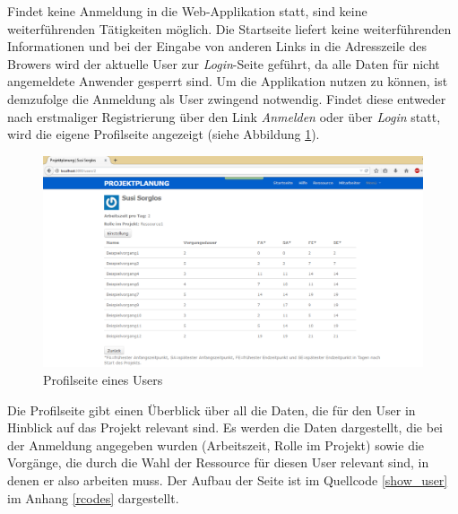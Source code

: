 \documentclass[a4paper,12pt,parskip,bibtotoc,liststotoc]{article}
\begin{document}
Findet keine Anmeldung in die Web-Applikation statt, sind keine weiterführenden Tätigkeiten möglich. Die Startseite liefert keine weiterführenden Informationen und bei der Eingabe von anderen Links in die Adresszeile des Browers wird der aktuelle User zur \textit{Login}-Seite geführt, da alle Daten für nicht angemeldete Anwender gesperrt sind. %
Um die Applikation nutzen zu können, ist demzufolge die Anmeldung als User zwingend notwendig. Findet diese entweder nach erstmaliger Registrierung über den Link \textit{Anmelden} oder über \textit{Login} statt, wird die eigene Profilseite angezeigt (siehe Abbildung \ref{Profil}).\\

\begin{figure}[h!]
  \begin{center}
    \includegraphics[width=120mm]{Bilder/Profilseite.png}
    \caption{Profilseite eines Users}  \label{Profil}
  \end{center}
\end{figure}

Die Profilseite gibt einen Überblick über all die Daten, die für den User in Hinblick auf das Projekt relevant sind. Es werden die Daten dargestellt, die bei der Anmeldung angegeben wurden (Arbeitszeit, Rolle im Projekt) sowie die Vorgänge, die durch die Wahl der Ressource für diesen User relevant sind, in denen er also arbeiten muss. Der Aufbau der Seite ist im Quellcode \ref{show_user} im Anhang \ref{rcodes} dargestellt.\\
\end{document}
